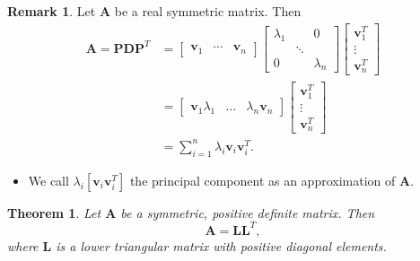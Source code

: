 \documentclass[12pt,openany]{book}
\newtheorem{theorem}{Theorem}[chapter]
\theoremstyle{definition}
\newtheorem{remark}{Remark}[chapter]
\renewcommand{\vec}[1]{\textbf{#1}}
\begin{document}
	\begin{remark}
		Let \(\textbf{A}\) be a real symmetric matrix. Then
		\begin{align*}
			\textbf{A}=\textbf{PD}\textbf{P}^T&=\begin{bmatrix}
				\vec{v}_1&\cdots&\vec{v}_n
			\end{bmatrix}\begin{bmatrix}
				\lambda_1 &&0\\ &\ddots&\\0&&\lambda_n
			\end{bmatrix}\begin{bmatrix}
			\vec{v}_1^T\\ \vdots\\\vec{v}_n^T
		\end{bmatrix}\\
		&=\begin{bmatrix}
			\vec{v}_1\lambda_1&\dots&\lambda_n\vec{v}_n
		\end{bmatrix}\begin{bmatrix}
			\vec{v}_1^T\\ \vdots\\\vec{v}_n^T
		\end{bmatrix}\\
		&=\sum_{i=1}^n\lambda_i\vec{v}_i\vec{v}_i^T.
		\end{align*}
		\begin{itemize}
			\item We call \(\lambda_i[\vec{v}_i\vec{v}_i^T]\) the principal component as an approximation of \(\textbf{A}\).
		\end{itemize}
	\end{remark}
	\newpage
	\begin{tcolorbox}[colframe=thmcolor,title={\color{white}\bf Cholesky Decomposition}]
		\begin{theorem}
			Let \(\textbf{A}\) be a symmetric, positive definite matrix. Then \[
			\textbf{A}=\textbf{L}\textbf{L}^T,
			\] where $\textbf{L}$ is a lower triangular matrix with positive diagonal elements.
		\end{theorem}
	\end{tcolorbox}
\end{document}
